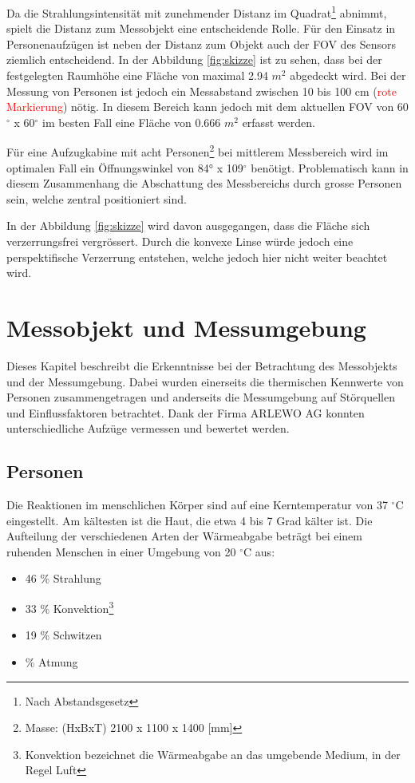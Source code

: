 Da die Strahlungsintensität mit zunehmender Distanz im Quadrat\footnote[7]{Nach Abstandsgesetz} abnimmt, spielt die Distanz zum Messobjekt eine entscheidende Rolle. Für den Einsatz in Personenaufzügen ist neben der Distanz zum Objekt auch der \ac{FOV} des Sensors ziemlich entscheidend. In der Abbildung \ref{fig:skizze} ist zu sehen, dass bei der festgelegten Raumhöhe eine Fläche von maximal 2.94 $m^2$ abgedeckt wird. Bei der Messung von Personen ist jedoch ein Messabstand zwischen 10 bis 100 cm (\textcolor{red}{rote Markierung}) nötig. In diesem Bereich kann jedoch mit dem aktuellen \ac{FOV} von 60$^\circ$ x 60$^\circ$ im besten Fall eine Fläche von 0.666 $m^2$ erfasst werden.

Für eine Aufzugkabine mit acht Personen\footnote[8]{Masse: (HxBxT) 2100 x 1100 x 1400 [mm]} bei mittlerem Messbereich wird im optimalen Fall ein Öffnungswinkel von 84° x 109$^\circ$ benötigt. Problematisch kann in diesem Zusammenhang die Abschattung des Messbereichs durch grosse Personen sein, welche zentral positioniert sind.

In der Abbildung \ref{fig:skizze} wird davon ausgegangen, dass die Fläche sich verzerrungsfrei vergrössert. Durch die konvexe Linse würde jedoch eine perspektifische Verzerrung entstehen, welche jedoch hier nicht weiter beachtet wird.


\section{Messobjekt und Messumgebung}
\label{sec:Messobjekt}
Dieses Kapitel beschreibt die Erkenntnisse bei der Betrachtung des Messobjekts und der Messumgebung. Dabei wurden einerseits die thermischen Kennwerte von Personen zusammengetragen und anderseits die Messumgebung auf Störquellen und Einflussfaktoren betrachtet. Dank der Firma ARLEWO AG konnten unterschiedliche Aufzüge vermessen und bewertet werden. 

\subsection{Personen}
\label{subsec:Personen}
Die Reaktionen im menschlichen Körper sind auf eine Kerntemperatur von 37 $^\circ$C eingestellt. Am kältesten ist die Haut, die etwa 4 bis 7 Grad  kälter ist. Die Aufteilung der verschiedenen Arten der Wärmeabgabe beträgt bei einem ruhenden Menschen in einer Umgebung von 20 $^\circ$C aus:
\begin{itemize}
	\item 46 \% Strahlung
	\item 33 \% Konvektion\footnote[9]{Konvektion bezeichnet die Wärmeabgabe an
		das umgebende Medium, in der Regel Luft}
	\item 19 \% Schwitzen
	\item {} \% Atmung
\end{itemize}

